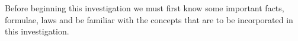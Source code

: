 {Before beginning this investigation we must first know some important facts, formulae, laws and be familiar with the concepts that are to be incorporated in this investigation.}

        
        
        
        
        
        
        
      
        
        
        
            
        
